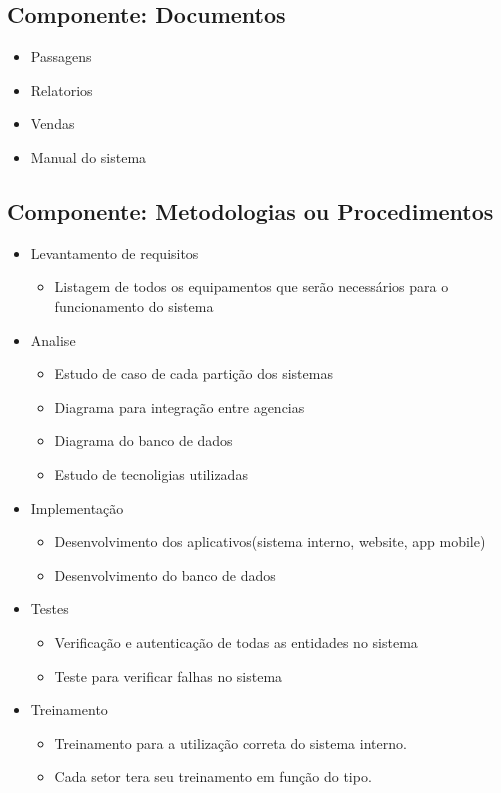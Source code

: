 \subsection{Componente: Documentos }
\begin{itemize}
       \item Passagens
       \item Relatorios
       \item Vendas
       \item Manual do sistema
\end{itemize}

\subsection{Componente: Metodologias ou Procedimentos}
\begin{itemize}
       \item Levantamento de requisitos
             \begin{itemize}
                    \item Listagem de todos os equipamentos que serão necessários para o funcionamento do
                          sistema
                          
             \end{itemize}
       \item Analise
             \begin{itemize}
                    \item Estudo de caso de cada partição dos sistemas
                    \item Diagrama para integração entre agencias
                    \item Diagrama do banco de dados
                    \item Estudo de tecnoligias utilizadas
             \end{itemize}
       \item Implementação
             \begin{itemize}
                    \item Desenvolvimento dos aplicativos(sistema interno, website, app mobile)
                    \item Desenvolvimento do banco de dados
             \end{itemize}
       \item Testes
             \begin{itemize}
                    \item Verificação e autenticação de todas as entidades no sistema
                    \item Teste para verificar falhas no sistema
             \end{itemize}
       \item Treinamento
             \begin{itemize}
                    \item Treinamento para a utilização correta do sistema interno.
                    \item Cada setor tera seu treinamento em função do tipo.
             \end{itemize}
\end{itemize}

